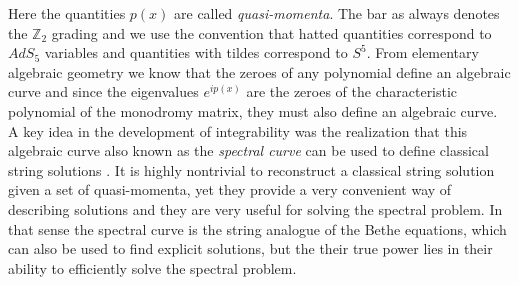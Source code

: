 Here the quantities $p(x)$ are called \emph{quasi-momenta}. The bar as always denotes the $\mathbb{Z}_2$ grading and we use the convention that hatted quantities correspond to $AdS_5$ variables and quantities with tildes correspond to $S^5$. From elementary algebraic geometry we know that the zeroes of any polynomial define an algebraic curve and since the eigenvalues $e^{ip(x)}$ are the zeroes of the characteristic polynomial of the monodromy matrix, they must also define an algebraic curve. A key idea in the development of integrability was the realization that this algebraic curve also known as the \emph{spectral curve} can be used to define classical string solutions \cite{action_variables2}. It is highly nontrivial to reconstruct a classical string solution given a set of quasi-momenta, yet they provide a very convenient way of describing solutions and they are very useful for solving the spectral problem. In that sense the spectral curve is the string analogue of the Bethe equations, which can also be used to find explicit solutions, but the their true power lies in their ability to efficiently solve the spectral problem. 

